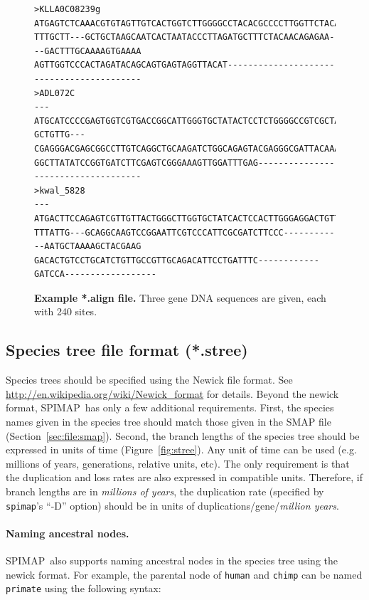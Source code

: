 \documentclass[11pt]{article}
\newcommand{\figref}[1]{Figure~\ref{#1}}
\newcommand{\secref}[1]{Section~\ref{#1}}
\newcommand{\spimap}{{\sf\scshape SPIMAP}}
\begin{document}
\begin{figure}
\begin{center}
\footnotesize
\begin{lstlisting}[frame=tblr]
>KLLA0C08239g
ATGAGTCTCAAACGTGTAGTTGTCACTGGTCTTGGGGCCTACACGCCCCTTGGTTCTACAGTTTCAAAGTCTTGGGCAGG
TTTGCTT---GCTGCTAAGCAATCACTAATACCCTTAGATGCTTTCTACAACAGAGAA---GACTTTGCAAAAGTGAAAA
AGTTGGTCCCACTAGATACAGCAGTGAGTAGGTTACAT------------------------------------------
>ADL072C
---ATGCATCCCCGAGTGGTCGTGACCGGCATTGGGTGCTATACTCCTCTGGGGCCGTCGCTAGCCCAGTCTTGGAAGGA
GCTGTTG---CGAGGGACGAGCGGCCTTGTCAGGCTGCAAGATCTGGCAGAGTACGAGGGCGATTACAAACCACTGTCGA
GGCTTATATCCGGTGATCTTCGAGTCGGGAAAGTTGGATTTGAG------------------------------------
>kwal_5828
---ATGACTTCCAGAGTCGTTGTTACTGGGCTTGGTGCTATCACTCCACTTGGGAGGACTGTTTCCGAGTCATGGAGAGC
TTTATTG---GCAGGCAAGTCCGGAATTCGTCCCATTCGCGATCTTCCC------------AATGCTAAAAGCTACGAAG
GACACTGTCCTGCATCTGTTGCCGTTGCAGACATTCCTGATTTC------------GATCCA------------------
\end{lstlisting}
\end{center}

\caption{{\bf Example *.align file.} Three gene DNA sequences
are given, each with 240 sites.}
\label{fig:align}
\end{figure}


\subsection{Species tree file format (*.stree)}
\label{sec:file:stree}

Species trees should be specified using the Newick file format.  See
\url{http://en.wikipedia.org/wiki/Newick\_format} for details.  Beyond
the newick format, \spimap\ has only a few additional requirements.
First, the species names given in the species tree should match those
given in the SMAP file (\secref{sec:file:smap}).  Second, the branch
lengths of the species tree should be expressed in units of time
(\figref{fig:stree}).  Any unit of time can be used (e.g. millions of
years, generations, relative units, etc).  The only requirement is
that the duplication and loss rates are also expressed in compatible
units.  Therefore, if branch lengths are in {\em millions of years},
the duplication rate (specified by {\tt spimap}'s ``-D'' option)
should be in units of duplications/gene/{\em million years}.

\paragraph{Naming ancestral nodes.}
\spimap\ also supports naming ancestral nodes in the species tree using
the newick format.  For example, the parental node of {\tt human} and 
{\tt chimp} can be named {\tt primate} using the following syntax:
\end{document}
